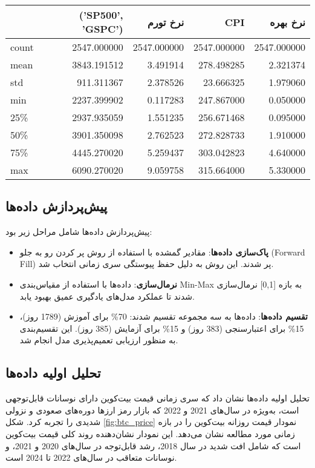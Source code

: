 \begin{tabular}{lrrrr}
	\hline
	& ('SP500', 'GSPC') & نرخ تورم & CPI & نرخ بهره \\
	\hline
	count & 2547.000000 & 2547.000000 & 2547.000000 & 2547.000000 \\
	mean & 3843.191512 & 3.491914 & 278.498285 & 2.321374 \\
	std & 911.311367 & 2.378526 & 23.666325 & 1.979060 \\
	min & 2237.399902 & 0.117283 & 247.867000 & 0.050000 \\
	25\% & 2937.935059 & 1.551235 & 256.671468 & 0.095000 \\
	50\% & 3901.350098 & 2.762523 & 272.828733 & 1.910000 \\
	75\% & 4445.270020 & 5.259437 & 303.042823 & 4.640000 \\
	max & 6090.270020 & 9.059758 & 315.664000 & 5.330000 \\
	\hline
\end{tabular}




\subsection{پیش‌پردازش داده‌ها}
پیش‌پردازش داده‌ها شامل مراحل زیر بود:
\begin{itemize}
	\item \textbf{پاک‌سازی داده‌ها}: مقادیر گمشده با استفاده از روش پر کردن رو به جلو (Forward Fill) پر شدند. این روش به دلیل حفظ پیوستگی سری زمانی انتخاب شد.
	\item \textbf{نرمال‌سازی}: داده‌ها با استفاده از مقیاس‌بندی Min-Max به بازه [0,1] نرمال‌سازی شدند تا عملکرد مدل‌های یادگیری عمیق بهبود یابد.
	\item \textbf{تقسیم داده‌ها}: داده‌ها به سه مجموعه تقسیم شدند: 70\% برای آموزش (1789 روز)، 15\% برای اعتبارسنجی (383 روز) و 15\% برای آزمایش (385 روز). این تقسیم‌بندی به منظور ارزیابی تعمیم‌پذیری مدل انجام شد.
\end{itemize}

\subsection{تحلیل اولیه داده‌ها}
تحلیل اولیه داده‌ها نشان داد که سری زمانی قیمت بیت‌کوین دارای نوسانات قابل‌توجهی است، به‌ویژه در سال‌های 2021 و 2022 که بازار رمز ارزها دوره‌های صعودی و نزولی شدیدی را تجربه کرد. شکل \ref{fig:btc_price} نمودار قیمت روزانه بیت‌کوین را در بازه زمانی مورد مطالعه نشان می‌دهد. این نمودار نشان‌دهنده روند کلی قیمت بیت‌کوین است که شامل افت شدید در سال 2018، رشد قابل‌توجه در سال‌های 2020 و 2021، و نوسانات متعاقب در سال‌های 2022 تا 2024 است.

